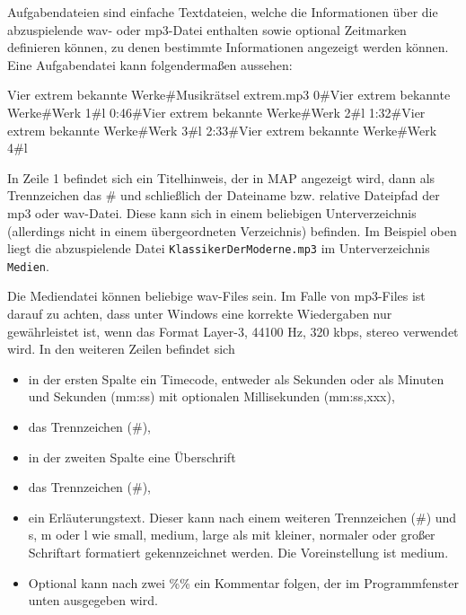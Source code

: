 \documentclass[a4paper,DIV=11
]{scrartcl}
\newenvironment{Shaded}{}{}
\newcommand{\NormalTok}[1]{#1}
\begin{document}
Aufgabendateien sind einfache Textdateien, welche die Informationen über
die abzuspielende wav- oder mp3-Datei enthalten sowie optional
Zeitmarken definieren können, zu denen bestimmte Informationen angezeigt
werden können. Eine Aufgabendatei kann folgendermaßen aussehen:

\begin{Shaded}
\begin{Highlighting}[]
\NormalTok{Vier extrem bekannte Werke\#Musikrätsel extrem.mp3}
\NormalTok{0\#Vier extrem bekannte Werke\#Werk 1\#l}
\NormalTok{0:46\#Vier extrem bekannte Werke\#Werk 2\#l}
\NormalTok{1:32\#Vier extrem bekannte Werke\#Werk 3\#l}
\NormalTok{2:33\#Vier extrem bekannte Werke\#Werk 4\#l}
\end{Highlighting}
\end{Shaded}

In Zeile 1 befindet sich ein Titelhinweis, der in MAP angezeigt wird,
dann als Trennzeichen das \# und schließlich der Dateiname bzw. relative
Dateipfad der mp3 oder wav-Datei. Diese kann sich in einem beliebigen
Unterverzeichnis (allerdings nicht in einem übergeordneten Verzeichnis)
befinden. Im Beispiel oben liegt die abzuspielende Datei
\texttt{KlassikerDerModerne.mp3} im Unterverzeichnis \texttt{Medien}.

Die Mediendatei können beliebige wav-Files sein. Im Falle von mp3-Files
ist darauf zu achten, dass unter Windows eine korrekte Wiedergaben nur
gewährleistet ist, wenn das Format Layer-3, 44100 Hz, 320 kbps, stereo
verwendet wird. In den weiteren Zeilen befindet sich

\begin{itemize}
\item
  in der ersten Spalte ein Timecode, entweder als Sekunden oder als
  Minuten und Sekunden (mm:ss) mit optionalen Millisekunden (mm:ss,xxx),
\item
  das Trennzeichen (\#),
\item
  in der zweiten Spalte eine Überschrift
\item
  das Trennzeichen (\#),
\item
  ein Erläuterungstext. Dieser kann nach einem weiteren Trennzeichen
  (\#) und s, m oder l wie small, medium, large als mit kleiner,
  normaler oder großer Schriftart formatiert gekennzeichnet werden. Die
  Voreinstellung ist medium.
\item
  Optional kann nach zwei \%\% ein Kommentar folgen, der im
  Programmfenster unten ausgegeben wird.
\end{itemize}
\end{document}
